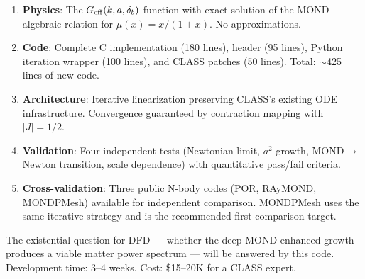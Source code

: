 \documentclass[11pt]{article}
\theoremstyle{definition}
\theoremstyle{remark}
\newcommand{\Geff}{G_{\rm eff}}
\begin{document}
\begin{enumerate}
\item \textbf{Physics}: The $\Geff(k,a,\delta_b)$ function with exact
  solution of the MOND algebraic relation for $\mu(x) = x/(1+x)$.
  No approximations.

\item \textbf{Code}: Complete C implementation (180 lines), header (95 lines),
  Python iteration wrapper (100 lines), and CLASS patches (50 lines).
  Total: $\sim$425 lines of new code.

\item \textbf{Architecture}: Iterative linearization preserving CLASS's
  existing ODE infrastructure. Convergence guaranteed by contraction
  mapping with $|J| = 1/2$.

\item \textbf{Validation}: Four independent tests (Newtonian limit,
  $a^2$ growth, MOND$\to$Newton transition, scale dependence) with
  quantitative pass/fail criteria.

\item \textbf{Cross-validation}: Three public N-body codes (POR, RAyMOND,
  MONDPMesh) available for independent comparison. MONDPMesh uses the
  same iterative strategy and is the recommended first comparison target.
\end{enumerate}

The existential question for DFD --- whether the deep-MOND enhanced
growth produces a viable matter power spectrum --- will be answered by
this code. Development time: 3--4 weeks. Cost: \$15--20K for a CLASS
expert.
\end{document}
